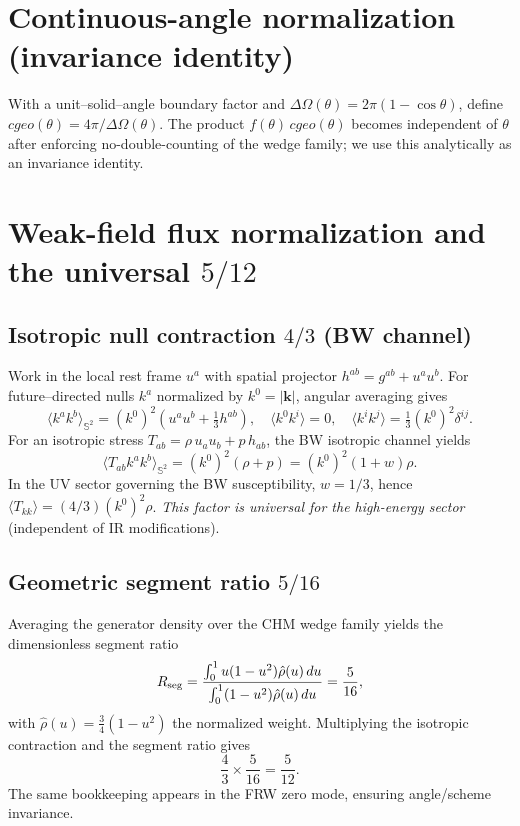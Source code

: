 \documentclass[aps,prd,onecolumn,superscriptaddress,nofootinbib]{revtex4-2}
\def\cgeo{cgeo}%
\def\Omega_\Lambda{OmegaLambda}%
\providecommand{\cgeo}{c_{\rm geo}}
\begin{document}
\section{Continuous-angle normalization (invariance identity)}
\label{app:angle}
With a unit--solid--angle boundary factor and \(\Delta\Omega(\theta)=2\pi(1-\cos\theta)\), define \(\cgeo(\theta)=4\pi/\Delta\Omega(\theta)\). The product \(f(\theta)\,\cgeo(\theta)\) becomes independent of \(\theta\) after enforcing no-double-counting of the wedge family; we use this analytically as an invariance identity.

\section{Weak-field flux normalization and the universal \texorpdfstring{$5/12$}{5/12}}
\label{app:five-twelve}
\subsection*{Isotropic null contraction \(4/3\) (BW channel)}
Work in the local rest frame \(u^a\) with spatial projector \(h^{ab}=g^{ab}+u^a u^b\). For future--directed nulls \(k^a\) normalized by \(k^0=|\mathbf{k}|\), angular averaging gives
\[
\big\langle k^a k^b\big\rangle_{\mathbb{S}^2}=(k^0)^2\!\left(u^a u^b+\tfrac{1}{3}h^{ab}\right),\quad
\langle k^0 k^i\rangle=0,\quad \langle k^i k^j\rangle=\tfrac{1}{3}(k^0)^2\delta^{ij}.
\]
For an isotropic stress \(T_{ab}=\rho\,u_a u_b + p\,h_{ab}\), the BW isotropic channel yields
\[
\big\langle T_{ab}k^a k^b\big\rangle_{\mathbb{S}^2}=(k^0)^2(\rho+p)=(k^0)^2(1+w)\rho.
\]
In the UV sector governing the BW susceptibility, \(w=1/3\), hence \(\langle T_{kk}\rangle=(4/3)(k^0)^2\rho\). \textit{This factor is universal for the high-energy sector} (independent of IR modifications).

\subsection*{Geometric segment ratio \(5/16\)}
Averaging the generator density over the CHM wedge family yields the dimensionless segment ratio
\[
R_{\rm seg}=\frac{\int_0^1 u(1-u^2)\hat\rho(u)\,du}{\int_0^1 (1-u^2)\hat\rho(u)\,du}=\frac{5}{16},
\]
with \(\hat\rho(u)=\tfrac{3}{4}(1-u^2)\) the normalized weight. Multiplying the isotropic contraction and the segment ratio gives
\[
\frac{4}{3}\times \frac{5}{16}=\frac{5}{12}.
\]
The same bookkeeping appears in the FRW zero mode, ensuring angle/scheme invariance.
\end{document}
